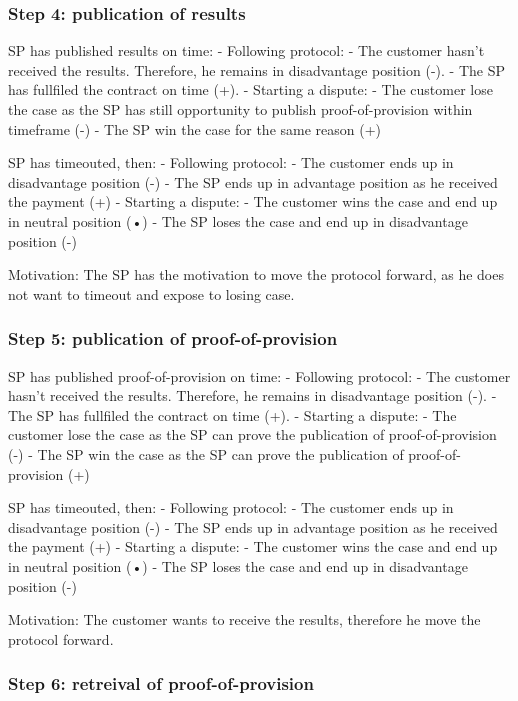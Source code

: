 \documentclass{article}
\begin{document}
\subsubsection{Step 4: publication of results}

SP has published results on time:
- Following protocol:
	- The customer hasn't received the results. Therefore, he remains in disadvantage position (-).
	- The SP has fullfiled the contract on time (+).
- Starting a dispute:
	- The customer lose the case as the SP has still opportunity to publish proof-of-provision within timeframe (-)
	- The SP win the case for the same reason (+)

SP has timeouted, then:
- Following protocol:
	- The customer ends up in disadvantage position (-)
	- The SP ends up in advantage position as he received the payment (+)
- Starting a dispute:
	- The customer wins the case and end up in neutral position (•)
	- The SP loses the case and end up in disadvantage position (-)


Motivation:
The SP has the motivation to move the protocol forward, as he does not want to timeout and expose to losing case.

\subsubsection{Step 5: publication of proof-of-provision}

SP has published proof-of-provision on time:
- Following protocol:
	- The customer hasn't received the results. Therefore, he remains in disadvantage position (-).
	- The SP has fullfiled the contract on time (+).
- Starting a dispute:
	- The customer lose the case as the SP can prove the publication of proof-of-provision (-)
	- The SP win the case as the SP can prove the publication of proof-of-provision (+)

SP has timeouted, then:
- Following protocol:
	- The customer ends up in disadvantage position (-)
	- The SP ends up in advantage position as he received the payment (+)
- Starting a dispute:
	- The customer wins the case and end up in neutral position (•)
	- The SP loses the case and end up in disadvantage position (-)


Motivation:
The customer wants to receive the results, therefore he move the protocol forward.

\subsubsection{Step 6: retreival of proof-of-provision}
\end{document}

